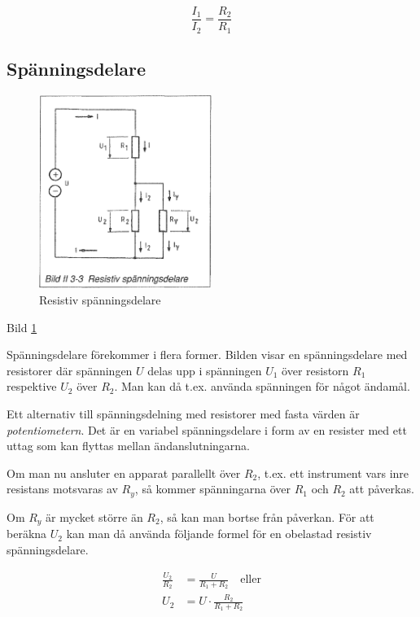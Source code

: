 \[\frac{I_1}{I_2} = \frac{R_2}{R_1}\]

\subsection{Spänningsdelare}

\begin{figure}
\includegraphics[width=0.5\textwidth]{images/bild_2_3-03}
\caption{Resistiv spänningsdelare}
\label{fig:BildII3-03}
\end{figure}

Bild \ref{fig:BildII3-03}

Spänningsdelare förekommer i flera former. Bilden visar en spänningsdelare med
resistorer där spänningen \(U\) delas upp i spänningen \(U_1\) över resistorn
\(R_1\) respektive \(U_2\) över \(R_2\). Man kan då t.ex. använda spänningen för
något ändamål.

Ett alternativ till spänningsdelning med resistorer med fasta värden är
\emph{potentiometern}. Det är en variabel spänningsdelare i form av en resister
med ett uttag som kan flyttas mellan ändanslutningarna.

Om man nu ansluter en apparat parallellt över \(R_2\), t.ex. ett instrument
vars inre resistans motsvaras av \(R_y\), så kommer spänningarna över \(R_1\)
och \(R_2\) att påverkas.

Om \(R_y\) är mycket större än \(R_2\), så kan man bortse från påverkan.
För att beräkna \(U_2\) kan man då använda följande formel för en obelastad
resistiv spänningsdelare.

\begin{align*}
\frac{U_2}{R_2} &= \frac{U}{R_1 + R_2} \quad \text{eller} \\
U_2 &= U \cdot \frac{R_2}{R_1 + R_2}
\end{align*}


